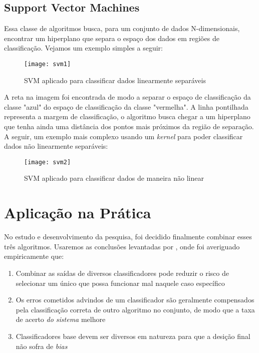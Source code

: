 \subsection{Support Vector Machines}

Essa classe de algoritmos busca, para um conjunto de dados N-dimensionais, encontrar um hiperplano que separa o espaço dos dados em regiões de classificação. Vejamos um exemplo simples a seguir:


\begin{figure}[ht]
	\centering
	\caption{SVM aplicado para classificar dados linearmente separáveis}
  \texttt{[image: svm1]}
\label{fig:svm1}  

\end{figure}



A reta na imagem foi encontrada de modo a separar o espaço de classificação da classe "azul" do espaço de classificação da classe "vermelha". A linha pontilhada representa a margem de classificação, o algoritmo busca chegar a um hiperplano que tenha ainda uma distância dos pontos mais próximos da região de separação. A seguir, um exemplo mais complexo usando um \textit{kernel}  para poder classificar dados não linearmente separáveis:

\begin{figure}[ht]
	\centering
	\caption{SVM aplicado para classificar dados de maneira não linear}
  \texttt{[image: svm2]}
\label{fig:svm2}  

\end{figure}

\section{Aplicação na Prática}

No estudo e desenvolvimento da pesquisa, foi decidido finalmente combinar esses três algoritmos. Usaremos as conclusões levantadas por \cite{comparativeEN}, onde foi averiguado empiricamente que: 

\begin{enumerate}
\item Combinar as saídas de diversos classificadores pode reduzir o risco de selecionar um único que possa funcionar mal naquele caso específico
\item Os erros cometidos advindos de um classificador são geralmente compensados pela classificação correta de outro algoritmo no conjunto, de modo que a taxa de acerto \textit{do sistema} melhore
\item Classificadores base devem ser diversos em natureza para que a desição final não sofra de \textit{bias}
\end{enumerate}



